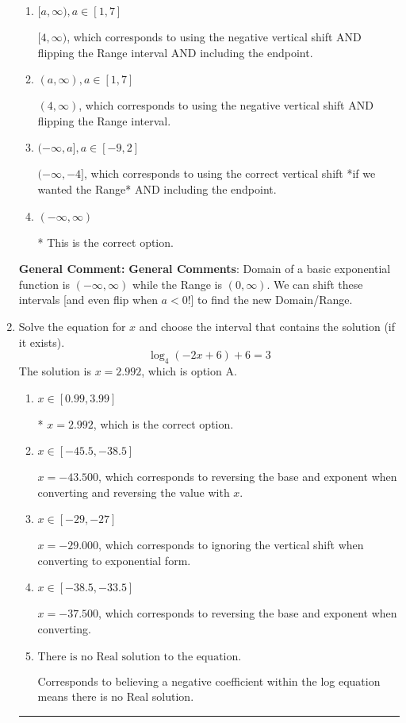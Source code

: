 \documentclass{extbook}[14pt]
\newcommand{\litem}[1]{\item #1

\rule{\textwidth}{0.4pt}}
\begin{document}
\begin{enumerate}
{\begin{enumerate}[label=\Alph*.]
$(-\infty, -4)$, which corresponds to using the correct vertical shift *if we wanted the Range*.
\item \( [a, \infty), a \in [1, 7] \)

$[4, \infty)$, which corresponds to using the negative vertical shift AND flipping the Range interval AND including the endpoint.
\item \( (a, \infty), a \in [1, 7] \)

$(4, \infty)$, which corresponds to using the negative vertical shift AND flipping the Range interval.
\item \( (-\infty, a], a \in [-9, 2] \)

$(-\infty, -4]$, which corresponds to using the correct vertical shift *if we wanted the Range* AND including the endpoint.
\item \( (-\infty, \infty) \)

* This is the correct option.
\end{enumerate}

\textbf{General Comment:} \textbf{General Comments}: Domain of a basic exponential function is $(-\infty, \infty)$ while the Range is $(0, \infty)$. We can shift these intervals [and even flip when $a<0$!] to find the new Domain/Range.
}
\litem{
Solve the equation for $x$ and choose the interval that contains the solution (if it exists).
\[ \log_{4}{(-2x+6)}+6 = 3 \]The solution is \( x = 2.992 \), which is option A.\begin{enumerate}[label=\Alph*.]
\item \( x \in [0.99, 3.99] \)

* $x = 2.992$, which is the correct option.
\item \( x \in [-45.5, -38.5] \)

$x = -43.500$, which corresponds to reversing the base and exponent when converting and reversing the value with $x$.
\item \( x \in [-29, -27] \)

$x = -29.000$, which corresponds to ignoring the vertical shift when converting to exponential form.
\item \( x \in [-38.5, -33.5] \)

$x = -37.500$, which corresponds to reversing the base and exponent when converting.
\item \( \text{There is no Real solution to the equation.} \)

Corresponds to believing a negative coefficient within the log equation means there is no Real solution.
\end{enumerate}

}
\end{enumerate}
\end{document}
